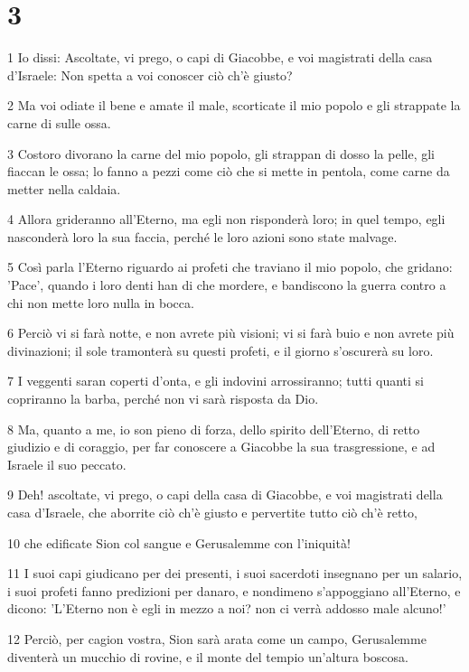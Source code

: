 \chapter{3}

\par 1 Io dissi: Ascoltate, vi prego, o capi di Giacobbe, e voi magistrati della casa d'Israele: Non spetta a voi conoscer ciò ch'è giusto?
\par 2 Ma voi odiate il bene e amate il male, scorticate il mio popolo e gli strappate la carne di sulle ossa.
\par 3 Costoro divorano la carne del mio popolo, gli strappan di dosso la pelle, gli fiaccan le ossa; lo fanno a pezzi come ciò che si mette in pentola, come carne da metter nella caldaia.
\par 4 Allora grideranno all'Eterno, ma egli non risponderà loro; in quel tempo, egli nasconderà loro la sua faccia, perché le loro azioni sono state malvage.
\par 5 Così parla l'Eterno riguardo ai profeti che traviano il mio popolo, che gridano: 'Pace', quando i loro denti han di che mordere, e bandiscono la guerra contro a chi non mette loro nulla in bocca.
\par 6 Perciò vi si farà notte, e non avrete più visioni; vi si farà buio e non avrete più divinazioni; il sole tramonterà su questi profeti, e il giorno s'oscurerà su loro.
\par 7 I veggenti saran coperti d'onta, e gli indovini arrossiranno; tutti quanti si copriranno la barba, perché non vi sarà risposta da Dio.
\par 8 Ma, quanto a me, io son pieno di forza, dello spirito dell'Eterno, di retto giudizio e di coraggio, per far conoscere a Giacobbe la sua trasgressione, e ad Israele il suo peccato.
\par 9 Deh! ascoltate, vi prego, o capi della casa di Giacobbe, e voi magistrati della casa d'Israele, che aborrite ciò ch'è giusto e pervertite tutto ciò ch'è retto,
\par 10 che edificate Sion col sangue e Gerusalemme con l'iniquità!
\par 11 I suoi capi giudicano per dei presenti, i suoi sacerdoti insegnano per un salario, i suoi profeti fanno predizioni per danaro, e nondimeno s'appoggiano all'Eterno, e dicono: 'L'Eterno non è egli in mezzo a noi? non ci verrà addosso male alcuno!'
\par 12 Perciò, per cagion vostra, Sion sarà arata come un campo, Gerusalemme diventerà un mucchio di rovine, e il monte del tempio un'altura boscosa.


